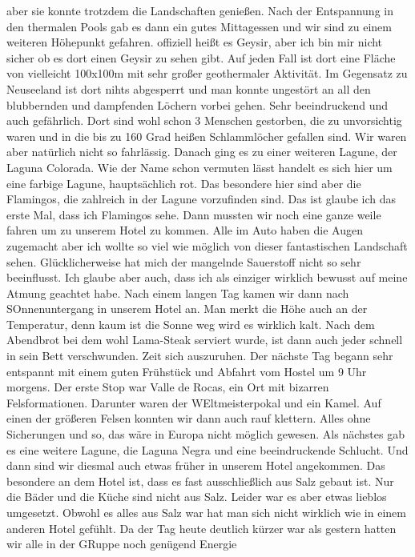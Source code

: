 \documentclass[11pt]{book}
\begin{document}
aber sie konnte trotzdem die Landschaften genießen. Nach der Entspannung in den thermalen Pools gab es dann ein gutes Mittagessen und wir sind zu einem 
weiteren Höhepunkt gefahren. offiziell heißt es Geysir, aber ich bin mir nicht sicher ob es dort einen Geysir zu sehen gibt. Auf jeden Fall ist dort eine 
Fläche von vielleicht 100x100m mit sehr großer geothermaler Aktivität. Im Gegensatz zu Neuseeland ist dort nihts abgesperrt und man konnte ungestört 
an all den blubbernden und dampfenden Löchern vorbei gehen. Sehr beeindruckend und auch gefährlich. Dort sind wohl schon 3 Menschen gestorben, die zu 
unvorsichtig waren und in die bis zu 160 Grad heißen Schlammlöcher gefallen sind. Wir waren aber natürlich nicht so fahrlässig. Danach ging es zu einer 
weiteren Lagune, der Laguna Colorada. Wie der Name schon vermuten lässt handelt es sich hier um eine farbige Lagune, hauptsächlich rot. Das besondere 
hier sind aber die Flamingos, die zahlreich in der Lagune vorzufinden sind. Das ist glaube ich das erste Mal, dass ich Flamingos sehe. Dann mussten 
wir noch eine ganze weile fahren um zu unserem Hotel zu kommen. Alle im Auto haben die Augen zugemacht aber ich wollte so viel wie möglich von dieser 
fantastischen Landschaft sehen. Glücklicherweise hat mich der mangelnde Sauerstoff nicht so sehr beeinflusst. Ich glaube aber auch, dass ich als einziger 
wirklich bewusst auf meine Atmung geachtet habe. Nach einem langen Tag kamen wir dann nach SOnnenuntergang in unserem Hotel an. Man merkt die Höhe auch 
an der Temperatur, denn kaum ist die Sonne weg wird es wirklich kalt. Nach dem Abendbrot bei dem wohl Lama-Steak serviert wurde, ist dann auch jeder 
schnell in sein Bett verschwunden. Zeit sich auszuruhen. 
Der nächste Tag begann sehr entspannt mit einem guten Frühstück und Abfahrt vom Hostel um 9 Uhr morgens. Der erste Stop war Valle de Rocas, ein Ort 
mit bizarren Felsformationen. Darunter waren der WEltmeisterpokal und ein Kamel. Auf einen der größeren Felsen konnten wir dann auch rauf klettern. 
Alles ohne Sicherungen und so, das wäre in Europa nicht möglich gewesen. Als nächstes gab es eine weitere Lagune, die Laguna Negra und eine beeindruckende 
Schlucht. Und dann sind wir diesmal auch etwas früher in unserem Hotel angekommen. Das besondere an dem Hotel ist, dass es fast ausschließlich aus 
Salz gebaut ist. Nur die Bäder und die Küche sind nicht aus Salz. Leider war es aber etwas lieblos umgesetzt. Obwohl es alles aus Salz war hat man sich nicht 
wirklich wie in einem anderen Hotel gefühlt. Da der Tag heute deutlich kürzer war als gestern hatten wir alle in der GRuppe noch genügend Energie 
\end{document}
